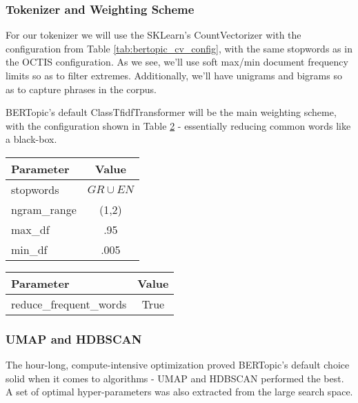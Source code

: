 \subsubsection{Tokenizer and Weighting Scheme}

For our tokenizer we will use the SKLearn's \citep{sklearn:11} CountVectorizer with the configuration from Table \ref{tab:bertopic_cv_config}, with the same stopwords as in the OCTIS configuration. As we see, we'll use soft max/min document frequency limits so as to filter extremes. Additionally, we'll have unigrams and bigrams so as to capture phrases in the corpus.

BERTopic's default ClassTfidfTransformer will be the main weighting scheme, with the configuration shown in Table \ref{tab:bertopic_ws_config} - essentially reducing common words like a black-box.

\begin{table}[H]
    \centering
    \begin{minipage}{.5\linewidth}
        \centering
        \begin{tabular}{lc}
            \toprule
            Parameter & Value \\
            \midrule
            stopwords & $GR\cup EN$ \\
            ngram\_range & (1,2) \\
            max\_df & .95 \\
            min\_df & .005 \\
            \bottomrule
        \end{tabular}
          \label{tab:bertopic_cv_config}
    \end{minipage}%
    \begin{minipage}{.5\linewidth}
        \centering
        \begin{tabular}{lc}
            \toprule
            Parameter & Value \\
            \midrule
            reduce\_frequent\_words & True \\
            \bottomrule
        \end{tabular}
         \label{tab:bertopic_ws_config}
    \end{minipage}
\end{table}

\subsubsection{UMAP and HDBSCAN}
The hour-long, compute-intensive optimization proved BERTopic's default choice solid when it comes to algorithms - UMAP and HDBSCAN performed the best. A set of optimal hyper-parameters was also extracted from the large search space. 

